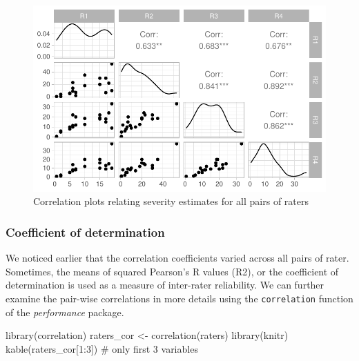 \documentclass[
  letterpaper,
  DIV=11,
  numbers=noendperiod]{scrreprt}
\newenvironment{Shaded}{\begin{snugshade}}{\end{snugshade}}
\newcommand{\CommentTok}[1]{\textcolor[rgb]{0.37,0.37,0.37}{#1}}
\newcommand{\DecValTok}[1]{\textcolor[rgb]{0.68,0.00,0.00}{#1}}
\newcommand{\FunctionTok}[1]{\textcolor[rgb]{0.28,0.35,0.67}{#1}}
\newcommand{\NormalTok}[1]{\textcolor[rgb]{0.00,0.23,0.31}{#1}}
\newcommand{\OtherTok}[1]{\textcolor[rgb]{0.00,0.23,0.31}{#1}}
\newcommand{\SpecialCharTok}[1]{\textcolor[rgb]{0.37,0.37,0.37}{#1}}
\begin{document}
\begin{figure}[H]

{\centering \includegraphics{./data-accuracy_files/figure-pdf/fig-correl-1.pdf}

}

\caption{\label{fig-correl}Correlation plots relating severity estimates
for all pairs of raters}

\end{figure}

\hypertarget{coefficient-of-determination}{%
\subsubsection{Coefficient of
determination}\label{coefficient-of-determination}}

We noticed earlier that the correlation coefficients varied across all
pairs of rater. Sometimes, the means of squared Pearson's R values (R2),
or the coefficient of determination is used as a measure of inter-rater
reliability. We can further examine the pair-wise correlations in more
details using the \texttt{correlation} function of the
\emph{performance} package.

\begin{Shaded}
\begin{Highlighting}[]
\FunctionTok{library}\NormalTok{(correlation)}
\NormalTok{raters\_cor }\OtherTok{\textless{}{-}} \FunctionTok{correlation}\NormalTok{(raters)}
\FunctionTok{library}\NormalTok{(knitr)}
\FunctionTok{kable}\NormalTok{(raters\_cor[}\DecValTok{1}\SpecialCharTok{:}\DecValTok{3}\NormalTok{]) }\CommentTok{\# only first 3 variables}
\end{Highlighting}
\end{Shaded}
\end{document}
